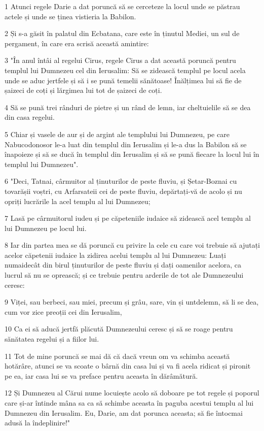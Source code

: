 \par 1 Atunci regele Darie a dat poruncă să se cerceteze la locul unde se păstrau actele și unde se ținea vistieria la Babilon.
\par 2 Și s-a găsit în palatul din Ecbatana, care este în ținutul Mediei, un sul de pergament, în care era scrisă această amintire:
\par 3 "În anul întâi al regelui Cirus, regele Cirus a dat această poruncă pentru templul lui Dumnezeu cel din Ierusalim: Să se zidească templul pe locul acela unde se aduc jertfele și să i se pună temelii sănătoase! Înălțimea lui să fie de șaizeci de coți și lărgimea lui tot de șaizeci de coți.
\par 4 Să se pună trei rânduri de pietre și un rând de lemn, iar cheltuielile să se dea din casa regelui.
\par 5 Chiar și vasele de aur și de argint ale templului lui Dumnezeu, pe care Nabucodonosor le-a luat din templul din Ierusalim și le-a dus la Babilon să se înapoieze și să se ducă în templul din Ierusalim și să se pună fiecare la locul lui în templul lui Dumnezeu".
\par 6 "Deci, Tatnai, cârmuitor al ținuturilor de peste fluviu, și Șetar-Boznai cu tovarășii voștri, cu Arfarsateii cei de peste fluviu, depărtați-vă de acolo și nu opriți lucrările la acel templu al lui Dumnezeu;
\par 7 Lasă pe cârmuitorul iudeu și pe căpeteniile iudaice să zidească acel templu al lui Dumnezeu pe locul lui.
\par 8 Iar din partea mea se dă poruncă cu privire la cele cu care voi trebuie să ajutați acelor căpetenii iudaice la zidirea acelui templu al lui Dumnezeu: Luați numaidecât din birul ținuturilor de peste fluviu și dați oamenilor acelora, ca lucrul să nu se oprească; și ce trebuie pentru arderile de tot ale Dumnezeului ceresc:
\par 9 Viței, sau berbeci, sau miei, precum și grâu, sare, vin și untdelemn, să li se dea, cum vor zice preoții cei din Ierusalim,
\par 10 Ca ei să aducă jertfă plăcută Dumnezeului ceresc și să se roage pentru sănătatea regelui și a fiilor lui.
\par 11 Tot de mine poruncă se mai dă că dacă vreun om va schimba această hotărâre, atunci se va scoate o bârnă din casa lui și va fi acela ridicat și pironit pe ea, iar casa lui se va preface pentru aceasta în dărâmătură.
\par 12 Și Dumnezeu al Cărui nume locuiește acolo să doboare pe tot regele și poporul care și-ar întinde mâna sa ca să schimbe aceasta în paguba acestui templu al lui Dumnezeu din Ierusalim. Eu, Darie, am dat porunca aceasta; să fie întocmai adusă la îndeplinire!"
